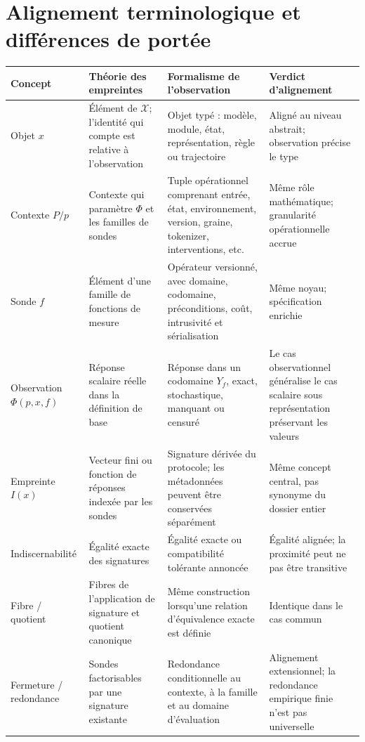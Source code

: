 \documentclass[11pt,a4paper,oneside]{report}
\newcommand{\X}{\mathcal X}
\begin{document}
\chapter{Alignement terminologique et différences de portée}
\setlength{\tabcolsep}{4pt}
\begin{longtable}{p{2.5cm}p{4.4cm}p{4.5cm}p{3.2cm}}
\toprule
\textbf{Concept} & \textbf{Théorie des empreintes} & \textbf{Formalisme de l'observation} & \textbf{Verdict d'alignement}\\
\midrule\endhead
Objet \(x\) & Élément de \(\X\); l'identité qui compte est relative à l'observation & Objet typé : modèle, module, état, représentation, règle ou trajectoire & Aligné au niveau abstrait; observation précise le type\\
Contexte \(P/p\) & Contexte qui paramètre \(\Phi\) et les familles de sondes & Tuple opérationnel comprenant entrée, état, environnement, version, graine, tokenizer, interventions, etc. & Même rôle mathématique; granularité opérationnelle accrue\\
Sonde \(f\) & Élément d'une famille de fonctions de mesure & Opérateur versionné, avec domaine, codomaine, préconditions, coût, intrusivité et sérialisation & Même noyau; spécification enrichie\\
Observation \(\Phi(p,x,f)\) & Réponse scalaire réelle dans la définition de base & Réponse dans un codomaine \(Y_f\), exact, stochastique, manquant ou censuré & Le cas observationnel généralise le cas scalaire sous représentation préservant les valeurs\\
Empreinte \(I(x)\) & Vecteur fini ou fonction de réponses indexée par les sondes & Signature dérivée du protocole; les métadonnées peuvent être conservées séparément & Même concept central, pas synonyme du dossier entier\\
{\small Indiscernabilité} & Égalité exacte des signatures & Égalité exacte ou compatibilité tolérante annoncée & Égalité alignée; la proximité peut ne pas être transitive\\
Fibre / quotient & Fibres de l'application de signature et quotient canonique & Même construction lorsqu'une relation d'équivalence exacte est définie & Identique dans le cas commun\\
Fermeture / redondance & Sondes factorisables par une signature existante & Redondance conditionnelle au contexte, à la famille et au domaine d'évaluation & Alignement extensionnel; la redondance empirique finie n'est pas universelle\\

\end{longtable}
\end{document}
